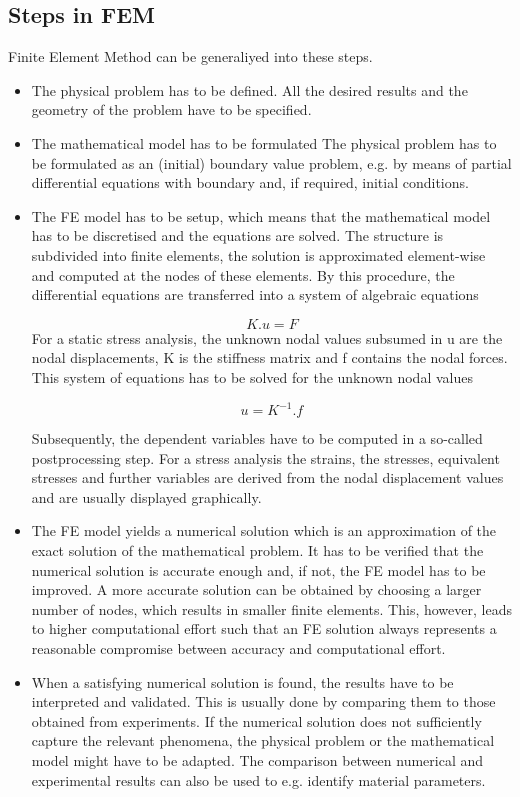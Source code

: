 \subsection{Steps in FEM}
Finite Element Method can be generaliyed into these steps.
\begin{itemize}
 
 \item The physical problem has to be defined. All the desired results and the geometry of the problem have to be specified.

\item The mathematical model has to be formulated
The physical problem has to be formulated as an (initial) boundary value problem, e.g. by means of partial differential equations with boundary and, if required, initial conditions.

\item The FE model has to be setup, which means that the mathematical model has to be discretised and the equations are solved. The structure is subdivided into finite elements, the solution is approximated element-wise and computed at the nodes of these elements. By this procedure, the differential equations are transferred into a system of algebraic equations

\begin{equation}
K.u = F
\end{equation}
For a static stress analysis, the unknown nodal values subsumed in u are the nodal displacements, K is the stiffness matrix and f contains the nodal forces. This system of equations has to be solved for the unknown nodal values

\begin{equation}
u = K^{-1}.f
\end{equation}

Subsequently, the dependent variables have to be computed in a so-called postprocessing step. For a stress analysis the strains, the stresses, equivalent stresses and further variables are derived from the nodal displacement values and are usually displayed graphically.

\item The FE model yields a numerical solution which is an approximation of the exact solution of the mathematical problem. It has to be verified that the numerical solution is accurate enough and, if not, the FE model has to be improved. A more accurate solution can be obtained by choosing a larger number of nodes, which results in smaller finite elements. This, however, leads to higher computational effort such that an FE solution always represents a reasonable compromise between accuracy and computational effort.


\item When a satisfying numerical solution is found, the results have to be interpreted and validated. This is usually done by comparing them to those obtained from experiments. If the numerical solution does not sufficiently capture the relevant phenomena, the physical problem or the mathematical model might have to be adapted. The comparison between numerical and experimental results can also be used to e.g. identify material parameters.
\end{itemize}



